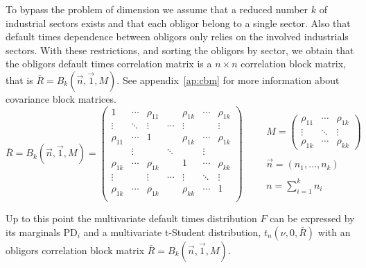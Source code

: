 \documentclass[11pt,fleqn]{book} %
\begin{document}
To bypass the problem of dimension we assume that a reduced number $k$ of 
industrial sectors exists and that each obligor belong to a single sector. 
Also that default times dependence between obligors only relies on the 
involved industrials sectors. With these restrictions, and sorting the obligors 
by sector, we obtain that the obligors default times correlation matrix is a 
$n {\times} n$ correlation block matrix, that is $\bar{R} = B_k(\vec{n},\vec{1},M)$. 
See appendix~\ref{ap:cbm} for more information about covariance block matrices. 
\begin{displaymath}
	\bar{R} = B_k(\vec{n},\vec{1},M) = 
	\left(
	\begin{array}{ccccccc}
		1         & \cdots & \rho_{11} &        & \rho_{1k} & \cdots & \rho_{1k} \\
		\vdots    & \ddots & \vdots    & \cdots & \vdots    &        & \vdots    \\
		\rho_{11} & \cdots & 1         &        & \rho_{1k} & \cdots & \rho_{1k} \\
		
		          & \vdots &           & \ddots &           & \vdots &           \\
		
		\rho_{1k} & \cdots & \rho_{1k} &        & 1         & \cdots & \rho_{kk} \\
		\vdots    &        & \vdots    & \cdots & \vdots    & \ddots & \vdots    \\
		\rho_{1k} & \cdots & \rho_{1k} &        & \rho_{kk} & \cdots & 1         \\
	\end{array}
	\right)
	\qquad 
	\begin{array}{l}
		M = 
		\left(
		\begin{array}{ccc}
			\rho_{11} & \cdots & \rho_{1k} \\
			\vdots    & \ddots & \vdots    \\
			\rho_{1k} & \cdots & \rho_{kk}
		\end{array}
		\right) \\
		\\
		\vec{n} = (n_1,\dots,n_k) \\
		\\
		n = \displaystyle \sum_{i=1}^{k} n_i
	\end{array}
\end{displaymath}

Up to this point the multivariate default times distribution $F$ can 
be expressed by its marginals $\text{PD}_i$ and a multivariate t-Student 
distribution, $t_n(\nu,0,\bar{R})$ with an obligors correlation block 
matrix $\bar{R} = B_k(\vec{n},\vec{1},M)$. 
\end{document}
